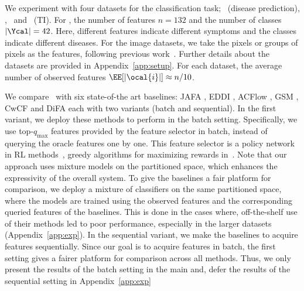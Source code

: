 \documentclass[letterpaper]{article}
\renewcommand{\cite}{\citep}
\begin{document}
We experiment with four datasets for the classification task; \dpr\ (disease prediction), \mnist, \cifar\ and \ti\ (TI). 
For \dpr, the number of features $n=132$ and the number of classes $|\Ycal|=42$. Here, different features indicate different symptoms and the classes indicate different diseases. For the image datasets, we take the pixels or groups of pixels as the features, following previous work~\cite{acflow,gsm}.
Further details about the datasets are provided in Appendix~\ref{app:setup}. 
For each dataset, the average number of observed features $\EE[|\ocal{i}|] \approx n/10$. 


We compare \our\ with six state-of-the art baselines: JAFA \cite{jafa}, EDDI \cite{eddi}, ACFlow \cite{acflow}, GSM \cite{gsm}, CwCF \cite{cwcf} and DiFA \cite{difa} each
with two variants  (batch and sequential).  
In the first variant, we deploy these methods to perform in the batch setting. Specifically, we use top-$q_{\max}$ features provided by the feature selector in batch, instead of querying the oracle features one by one.  This feature selector is a policy network in RL methods~\cite{gsm,jafa,cwcf,difa}, greedy algorithms for maximizing rewards in~\cite{eddi,acflow}. 
Note that our approach uses mixture models on the partitioned space, which enhances the expressivity of the overall 
system. To give the baselines a fair platform for comparison, we deploy a mixture of classifiers on the same partitioned space, where the models are trained using the observed features and the corresponding queried features of the baselines.  This is done in the cases where, off-the-shelf use of their methods led to poor performance, especially in the larger datasets (Appendix~\ref{app:exp}). 
In the sequential variant, we make the baselines to acquire features sequentially.
Since our goal is to acquire features in batch, the first setting gives a fairer platform for comparison across all methods. Thus, we only present the results of the batch setting in the main and, defer the results of the sequential setting in Appendix~\ref{app:exp} 
\end{document}
